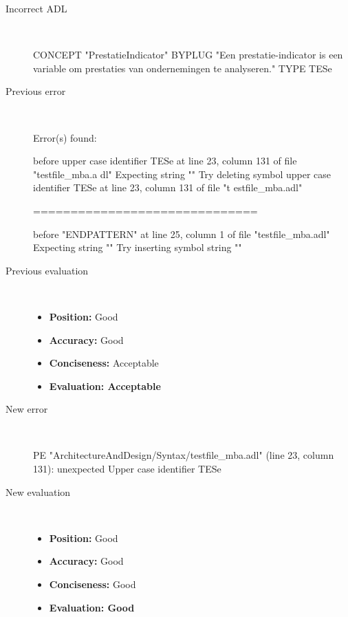 \begin{description}
  \item[Incorrect ADL]~\\
\begin{adl}
CONCEPT "PrestatieIndicator" BYPLUG "Een prestatie-indicator is een variable om prestaties van ondernemingen te analyseren." TYPE TESe\end{adl}
  \item[Previous error]~\\
\begin{haskell}
Error(s) found:

before upper case identifier TESe at line 23, column 131 of file "testfile_mba.a
dl"
Expecting string ""
Try deleting symbol upper case identifier TESe at line 23, column 131 of file "t
estfile_mba.adl"

==============================

before "ENDPATTERN" at line 25, column 1 of file "testfile_mba.adl"
Expecting string ""
Try inserting symbol string ""
\end{haskell}
  \item[Previous evaluation]~\\
    \begin{itemize}
    \item \textbf{Position:} Good
    \item \textbf{Accuracy:} Good
    \item \textbf{Conciseness:} Acceptable
    \item \textbf{Evaluation: Acceptable}
    \end{itemize}
  \item[New error]~\\
\begin{haskell}
PE "ArchitectureAndDesign/Syntax/testfile_mba.adl" (line 23, column 131):
unexpected Upper case identifier TESe\end{haskell}
  \item[New evaluation]~\\
    \begin{itemize}
    \item \textbf{Position:} Good
    \item \textbf{Accuracy:} Good
    \item \textbf{Conciseness:} Good
    \item \textbf{Evaluation: Good}
    \end{itemize}
  \end{description}

